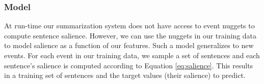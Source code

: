 %
%
%
%
%
%
%

\subsubsection{Model}

At run-time
our summarization system
does not have access to event nuggets to compute sentence salience. 
However, we can use the nuggets
in our training data to model salience as a function of our features.
Such a model generalizes to new events.
For each event in our training data, we sample a set of sentences and  each 
sentence's salience is computed according to Equation \ref{eq:salience}.
This results in a training set of sentences and the target values 
(their salience) to predict.


